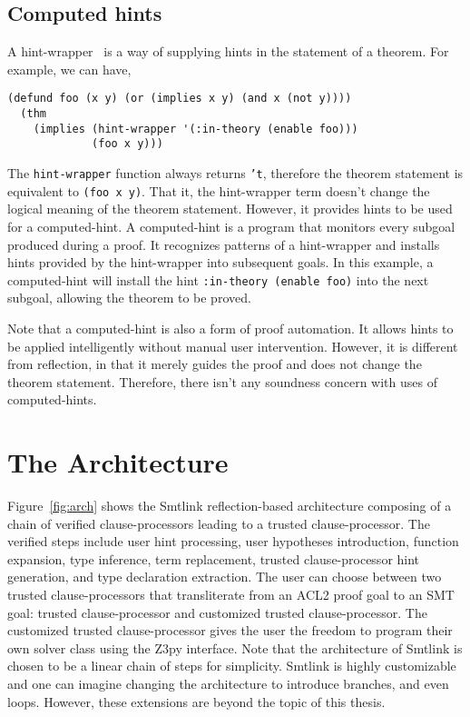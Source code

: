 \subsection{Computed hints}
A hint-wrapper~\cite{hint-wrapper} is a way of supplying hints in the statement
of a theorem. For example, we can have,

\begin{lstlisting}[style=lisp]
  (defund foo (x y) (or (implies x y) (and x (not y))))
  (thm
    (implies (hint-wrapper '(:in-theory (enable foo)))
             (foo x y)))
\end{lstlisting}

The \texttt{hint-wrapper} function always returns \texttt{'t}, therefore the
theorem statement is equivalent to \texttt{(foo x y)}.
That it, the hint-wrapper term doesn't change the logical meaning of the theorem 
statement.
However, it provides hints to be used for a computed-hint. A computed-hint is a
program that monitors every subgoal produced during a proof. It recognizes
patterns of a hint-wrapper and installs hints provided by the hint-wrapper into
subsequent goals. In this example, a computed-hint will install the hint
\texttt{:in-theory (enable foo)} into the next subgoal, allowing the theorem to
be proved.

Note that a computed-hint is also a form of proof automation. It allows hints to
be applied intelligently without manual user intervention. However, it is
different from reflection, in that it merely guides the proof and does not
change the theorem statement. Therefore, there isn't any soundness concern with
uses of computed-hints.

\section{The Architecture}
\label{sec:arch}


Figure~\ref{fig:arch} shows the Smtlink reflection-based architecture composing
of a chain of verified clause-processors leading to a trusted clause-processor.
The verified steps include user hint processing, user hypotheses introduction,
function expansion, type inference, term replacement, trusted clause-processor
hint generation, and type declaration extraction.
The user can choose between two trusted clause-processors that transliterate
from an ACL2 proof goal to an SMT goal: trusted clause-processor and customized
trusted clause-processor.
The customized trusted clause-processor gives the user the freedom to program
their own solver class using the Z3py interface.
Note that the architecture of Smtlink is chosen to be a linear chain of steps
for simplicity. Smtlink is highly customizable and one can imagine changing the
architecture to introduce branches, and even loops. However, these extensions
are beyond the topic of this thesis.


